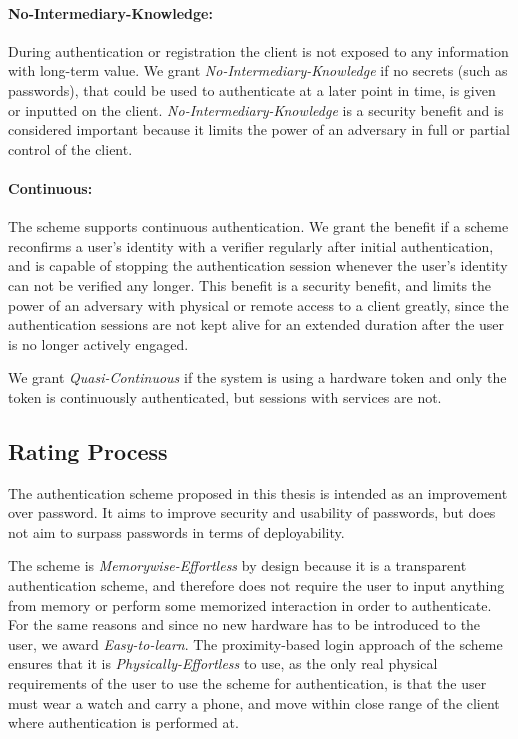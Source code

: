 \paragraph{No-Intermediary-Knowledge:} During authentication or registration the client is not exposed to any information with long-term value. We grant \textit{No-Intermediary-Knowledge} if no secrets (such as passwords), that could be used to authenticate at a later point in time, is given or inputted on the client. \textit{No-Intermediary-Knowledge} is a security benefit and is considered important because it limits the power of an adversary in full or partial control of the client.
    
\paragraph{Continuous:} The scheme supports continuous authentication. We grant the benefit if a scheme reconfirms a user's identity with a verifier regularly after initial authentication, and is capable of stopping the authentication session whenever the user's identity can not be verified any longer. This benefit is a security benefit, and limits the power of an adversary with physical or remote access to a client greatly, since the authentication sessions are not kept alive for an extended duration after the user is no longer actively engaged.

We grant \textit{Quasi-Continuous} if the system is using a hardware token and only the token is continuously authenticated, but sessions with services are not.

\subsection{Rating Process} \label{sec:rating_process}
The authentication scheme proposed in this thesis is intended as an improvement over password. It aims to improve security and usability of passwords, but does not aim to surpass passwords in terms of deployability.

The scheme is \textit{Memorywise-Effortless} by design because it is a transparent authentication scheme, and therefore does not require the user to input anything from memory or perform some memorized interaction in order to authenticate. For the same reasons and since no new hardware has to be introduced to the user, we award \textit{Easy-to-learn}. The proximity-based login approach of the scheme ensures that it is \textit{Physically-Effortless} to use, as the only real physical requirements of the user to use the scheme for authentication, is that the user must wear a watch and carry a phone, and move within close range of the client where authentication is performed at. 

